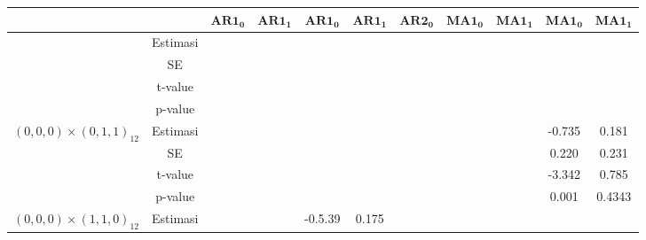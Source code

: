 \begin{enumerate}[label=\alph*.]
\begin{longtable}{|c|c|c|c|c|c|c|c|c|c|c|}
            & &
            $\mathbf{AR1_0}$ & $\mathbf{AR1_1}$ &
            $\mathbf{AR1_0}$ & $\mathbf{AR1_1}$ & $\mathbf{AR2_0}$ &
            $\mathbf{MA1_0}$ & $\mathbf{MA1_1}$ &
            $\mathbf{MA1_0}$ & $\mathbf{MA1_1}$ \\
            \hline
            \endhead

            \hline
            \endfoot
            \hline
            \endlastfoot

            \multirow{4}{*}{$(0,0,0)\times(0,1,0)_{12}$}
            & Estimasi
            & {} & {}
            & {} & {} & {}
            & {} & {}
            & {} & {} \\ \cline{2-11}

            & SE
            & {} & {}
            & {} & {} & {}
            & {} & {}
            & {} & {} \\ \cline{2-11}

            & t-value
            & {} & {}
            & {} & {} & {}
            & {} & {}
            & {} & {} \\ \cline{2-11}

            & p-value
            & {} & {}
            & {} & {} & {}
            & {} & {}
            & {} & {} \\ \hline

            \multirow{4}{*}{$(0,0,0)\times(0,1,1)_{12}$}
            & Estimasi
            & {} & {}
            & {} & {} & {}
            & {} & {}
            & {-0.735} & {0.181} \\ \cline{2-11}

            & SE
            & {} & {}
            & {} & {} & {}
            & {} & {}
            & {0.220} & {0.231} \\ \cline{2-11}

            & t-value
            & {} & {}
            & {} & {} & {}
            & {} & {}
            & {-3.342} & {0.785} \\ \cline{2-11}

            & p-value
            & {} & {}
            & {} & {} & {}
            & {} & {}
            & {0.001} & {0.4343} \\ \hline

            \multirow{4}{*}{$(0,0,0)\times(1,1,0)_{12}$}
            & Estimasi
            & {} & {}
            & {-0.5.39} & {0.175} & {}
            & {} & {}
            & {} & {} \\ \cline{2-11}


\end{longtable}
\end{enumerate}
